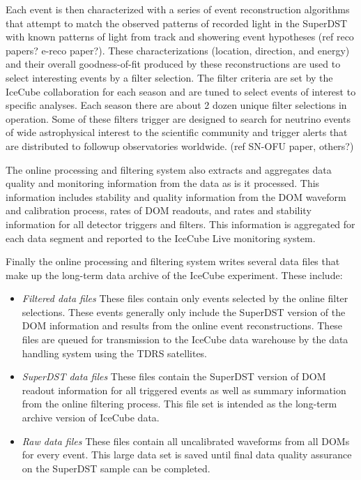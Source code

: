 Each event is then characterized with a series of event reconstruction algorithms that attempt to match
the observed patterns of recorded light in the SuperDST with known patterns of light
from track and showering event hypotheses (ref reco papers?  e-reco paper?).  These characterizations (location, direction, and energy) and their 
overall goodness-of-fit produced by these reconstructions are used to select interesting 
events by a filter selection.  The filter criteria are set by the IceCube collaboration for each season
and are tuned to select events of interest to specific analyses.  Each season there are
about 2 dozen unique filter selections in operation.  Some of these filters trigger are
designed to search for neutrino events of wide astrophysical interest to the scientific community and trigger
alerts that are distributed to followup observatories worldwide. (ref SN-OFU paper, others?)

The online processing and filtering system also extracts and aggregates data quality and monitoring information
from the data as is it processed.  This information includes stability and quality information from the
DOM waveform and calibration process, rates of DOM readouts, and rates and stability
information for all detector triggers and filters.  This information is aggregated for each data segment and
reported to the IceCube Live monitoring system.  

Finally the online processing and filtering system writes several data files that make up the long-term data archive of the IceCube
experiment.  These include:
\begin{itemize}
\item \emph {Filtered data files} These files contain only events selected by the online filter selections.  These events
generally only include the SuperDST version of the DOM information and results from the online event reconstructions.  These
files are queued for transmission to the IceCube data warehouse by the data handling system using the TDRS satellites. 
\item \emph {SuperDST data files} These files contain the SuperDST version of DOM readout information for all triggered events as well as summary
information from the online filtering process.  This file set is intended as the long-term archive version of IceCube data.
\item \emph {Raw data files}  These files contain all uncalibrated waveforms from all DOMs for every event.  This large data
set is saved until final data quality assurance on the SuperDST sample can be completed.
\end{itemize}

